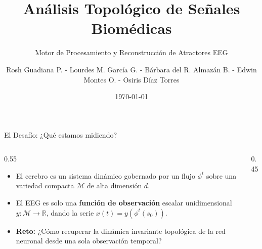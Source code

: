 \documentclass[10pt, aspectratio=169]{beamer} %
\title{Análisis Topológico de Señales Biomédicas}
\subtitle{Motor de Procesamiento y Reconstrucción de Atractores EEG}
\author{Rosh Guadiana P. - Lourdes M. García G. - Bárbara del R. Almazán B. - Edwin Montes O. - Osiris Díaz Torres}
\date{\today}
\institute{Biomédica y Topología}
\begin{document}
\maketitle

\begin{frame}{El Desafío: ¿Qué estamos midiendo?}
    \begin{columns}
        \begin{column}{0.55\textwidth}
            \begin{itemize}
                \item El cerebro es un sistema dinámico gobernado por un flujo $\phi^t$ sobre una variedad compacta $\mathcal{M}$ de \alert{alta dimensión} $d$.
                \item El EEG es solo una \textbf{función de observación} escalar unidimensional $y: \mathcal{M} \to \mathbb{R}$, dando la serie $x(t) = y(\phi^t(s_0))$.
                \item \textbf{Reto:} ¿Cómo recuperar la dinámica invariante topológica de la red neuronal desde una sola observación temporal?
            \end{itemize}
        \end{column}
        \begin{column}{0.45\textwidth}
            \centering
        \end{column}
    \end{columns}
\end{frame}
\end{document}
